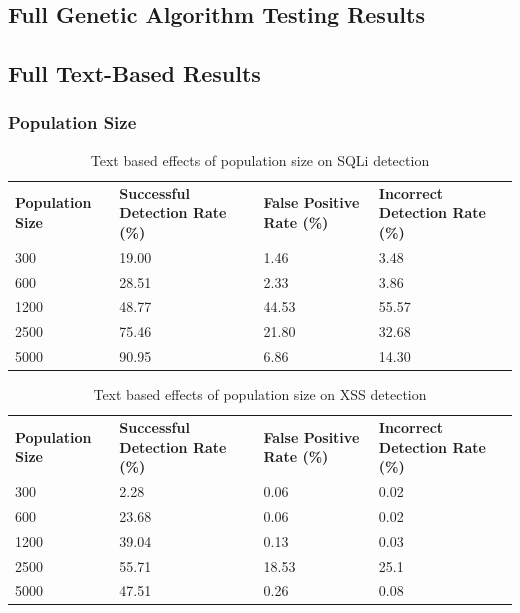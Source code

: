 \begin{appendices}
\chapter{Full Genetic Algorithm Testing Results} \label{app:geneticFullResults}
\section{Full Text-Based Results}
\subsection{Population Size}
\begin{table}[h]
	\centering
	\begin{tabular}{|p{1.5in}|p{1in}|p{1in}|p{1in}|}
	\hline
	\textbf{Population Size} & \textbf{Successful Detection Rate (\%)} & \textbf{False Positive Rate (\%)} & \textbf{Incorrect Detection Rate (\%)}  \\
	\hhline{|=|=|=|=|}
	300 & 19.00 & 1.46 & 3.48 \\
	\hline
	600 & 28.51 & 2.33 & 3.86 \\
	\hline
	1200 & 48.77 & 44.53 & 55.57 \\
	\hline
	2500 & 75.46 & 21.80 & 32.68 \\
	\hline
	5000 & 90.95 & 6.86 & 14.30 \\
	\hline
	\end{tabular}
	\caption{Text based effects of population size on SQLi detection}
\end{table}
\begin{table}[h]
	\centering
	\begin{tabular}{|p{1.5in}|p{1in}|p{1in}|p{1in}|}
	\hline
	\textbf{Population Size} & \textbf{Successful Detection Rate (\%)} & \textbf{False Positive Rate (\%)} & \textbf{Incorrect Detection Rate (\%)}  \\
	\hhline{|=|=|=|=|}
	300 & 2.28 & 0.06 & 0.02 \\
	\hline
	600 & 23.68 & 0.06 & 0.02 \\
	\hline
	1200 & 39.04 & 0.13 & 0.03 \\
	\hline
	2500 & 55.71 & 18.53 & 25.1 \\
	\hline
	5000 & 47.51 & 0.26 & 0.08 \\
	\hline
	\end{tabular}
	\caption{Text based effects of population size on XSS detection}
\end{table}
\begin{table}[h]
	\centering
	\begin{tabular}{|p{1.5in}|p{1in}|p{1in}|p{1in}|}

\end{tabular}
\end{table}
\end{appendices}
